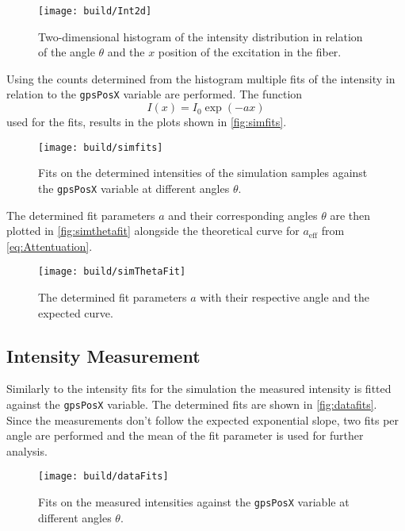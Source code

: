 \begin{figure}[H]
	\centering
	\texttt{[image: build/Int2d]}
	\caption{Two-dimensional histogram of the intensity distribution in relation of the angle $\theta$ and the $x$ position of the excitation in the fiber.}
	\label{fig:int2d}
\end{figure}

Using the counts determined from the histogram multiple fits of the intensity in relation to the \texttt{gpsPosX} variable are performed. %
The function 
\begin{equation}
	I(x) = I_0 \exp\left(-ax\right)
\end{equation}
used for the fits, results in the plots shown in \autoref{fig:simfits}.

\begin{figure}[H]
	\centering
	\texttt{[image: build/simfits]}
	\caption{Fits on the determined intensities of the simulation samples against the \texttt{gpsPosX} variable at different angles $\theta$.}
	\label{fig:simfits}
\end{figure}

The determined fit parameters $a$ and their corresponding angles $\theta$ are then plotted in \autoref{fig:simthetafit} alongside the theoretical curve for $a_{\mathrm{eff}}$ from \eqref{eq:Attentuation}.

\begin{figure}
	\centering
	\texttt{[image: build/simThetaFit]}
	\caption{The determined fit parameters $a$ with their respective angle and the expected curve.}
	\label{fig:simthetafit}
\end{figure}

\subsection{Intensity Measurement}
Similarly to the intensity fits for the simulation the measured intensity is fitted against the \texttt{gpsPosX} variable. %
The determined fits are shown in \autoref{fig:datafits}. Since the measurements don't follow the expected exponential slope, two fits per angle are performed and the mean of the fit parameter is used for further analysis.


\begin{figure}
	\centering
	\texttt{[image: build/dataFits]}
	\caption{Fits on the measured intensities against the \texttt{gpsPosX} variable at different angles $\theta$.}
	\label{fig:datafits}
\end{figure}

